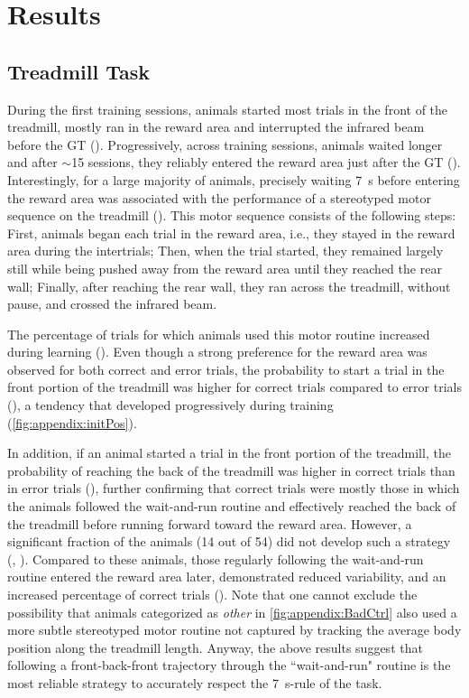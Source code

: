 \section{Results}
\label{ch:time:results}

\subsection{Treadmill Task}
\label{ch:time:treadmill}
During the first training sessions, animals started most trials in the front of the treadmill, mostly ran in the reward area and interrupted the infrared beam before the GT ().
Progressively, across training sessions, animals waited longer and after $\sim$15 sessions, they reliably entered the reward area just after the GT ().
Interestingly, for a large majority of animals, precisely waiting 7~s before entering the reward area was associated with the performance of a stereotyped motor sequence on the treadmill ().
This motor sequence consists of the following steps:
    First, animals began each trial in the reward area, i.e., they stayed in the reward area during the intertrials;
    Then, when the trial started, they remained largely still while being pushed away from the reward area until they reached the rear wall;
    Finally, after reaching the rear wall, they ran across the treadmill, without pause, and crossed the infrared beam.

The percentage of trials for which animals used this motor routine increased during learning ().
Even though a strong preference for the reward area was observed for both correct and error trials, the probability to start a trial in the front portion of the treadmill was higher for correct trials compared to error trials (), a tendency that developed progressively during training (\autoref{fig:appendix:initPos}).
\par
In addition, if an animal started a trial in the front portion of the treadmill, the probability of reaching the back of the treadmill was higher in correct trials than in error trials (), further confirming that correct trials were mostly those in which the animals followed the wait-and-run routine and effectively reached the back of the treadmill before running forward toward the reward area.
However, a significant fraction of the animals (14 out of 54) did not develop such a strategy (, ).
Compared to these animals, those regularly following the wait-and-run routine entered the reward area later, demonstrated reduced variability, and an increased percentage of correct trials ().
Note that one cannot exclude the possibility that animals categorized as \textit{other} in \autoref{fig:appendix:BadCtrl} also used a more subtle stereotyped motor routine not captured by tracking the average body position along the treadmill length.
Anyway, the above results suggest that following a front-back-front trajectory through the ``wait-and-run" routine is the most reliable strategy to accurately respect the 7~s-rule of the task.


